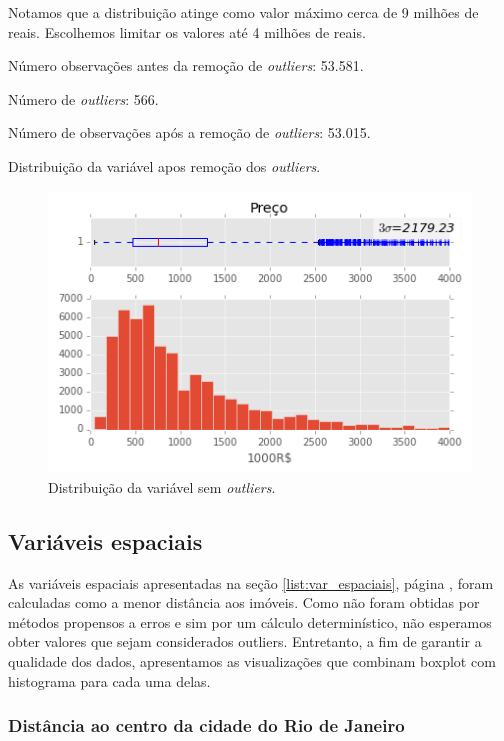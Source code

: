   Notamos que a distribuição atinge como valor máximo cerca de 9 milhões de reais. Escolhemos limitar os valores até 4 milhões de reais.
  
  
  Número observações antes da remoção de \textit{outliers}: 53.581. 
  
  Número de \textit{outliers}: 566.
  
  Número de observações após a remoção de \textit{outliers}: 53.015.
  
  Distribuição da variável  apos remoção dos \textit{outliers}.
  
  \begin{figure}[H]
  	\centering
  	\includegraphics[width=0.8\linewidth]{img/var_preco_boxhist_depois}
  	\caption{Distribuição da variável  sem \textit{outliers}.}
  	\label{fig:var_preco_boxhist_depois}
  \end{figure}
  
  
\subsection{Variáveis espaciais}

As variáveis espaciais apresentadas na seção \ref{list:var_espaciais}, página \pageref{list:var_espaciais}, foram calculadas como a  menor distância aos imóveis. Como não foram obtidas por métodos propensos a erros e sim por um cálculo determinístico, não esperamos obter valores que sejam considerados outliers. Entretanto, a fim de garantir a qualidade dos dados, apresentamos as visualizações que combinam boxplot com histograma para cada uma delas.

\subsubsection{Distância ao centro da cidade do Rio de Janeiro}

